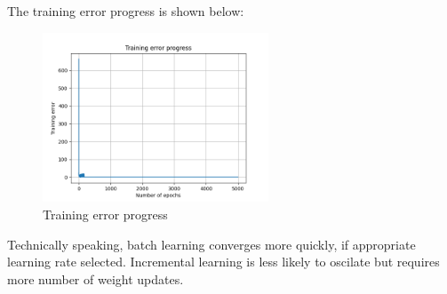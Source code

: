 The training error progress is shown below:

\begin{figure}[H]
    \centering
    \includegraphics[width=0.6\textwidth]{./2023April/training error progress.png}
    \caption{Training error progress}
    \label{training error progress}
\end{figure}

Technically speaking, batch learning converges more quickly, if appropriate learning rate selected. Incremental learning is less likely to oscilate but requires more number of weight updates.